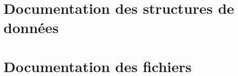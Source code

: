 \documentclass[twoside]{book}
\newcommand{\+}{\discretionary{\mbox{\scriptsize$\hookleftarrow$}}{}{}}
\newcommand{\clearemptydoublepage}{%
    \newpage{\pagestyle{empty}\cleardoublepage}%
  }
\begin{document}
\chapter{Documentation des structures de données}

\chapter{Documentation des fichiers}



























  \backmatter
  \newpage
  \clearemptydoublepage
  \printindex
\end{document}
